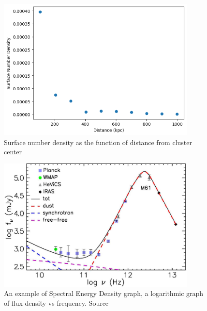 \documentclass{article}
\begin{document}
\begin{figure}
    \centering
    \includegraphics[width=100mm]{SNDensity.png}
    \caption{Surface number density as the function of distance from cluster center}
    \label{fig:sndensity}
\end{figure}

\begin{figure}
    \centering
    \includegraphics[width=100mm]{SED.png}
    \caption{An example of Spectral Energy Density graph, a logarithmic graph of flux density vs frequency. Source \parencite{Zotti2018}}
    \label{fig:sedgraph}
\end{figure}
\end{document}
